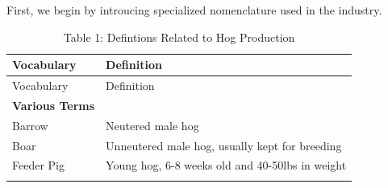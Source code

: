 \documentclass[]{book}
\theoremstyle{definition}
\theoremstyle{definition}
\theoremstyle{remark}
\begin{document}
First, we begin by introucing specialized nomenclature used in the
industry.

\begin{longtable}[]{@{}ll@{}}
\caption{Table 1: Defintions Related to Hog Production}\tabularnewline
\toprule
\begin{minipage}[b]{0.31\columnwidth}\raggedright\strut
Vocabulary\strut
\end{minipage} & \begin{minipage}[b]{0.24\columnwidth}\raggedright\strut
Definition\strut
\end{minipage}\tabularnewline
\midrule
\endfirsthead
\toprule
\begin{minipage}[b]{0.31\columnwidth}\raggedright\strut
Vocabulary\strut
\end{minipage} & \begin{minipage}[b]{0.24\columnwidth}\raggedright\strut
Definition\strut
\end{minipage}\tabularnewline
\midrule
\endhead
\begin{minipage}[t]{0.31\columnwidth}\raggedright\strut
\textbf{Various Terms}\strut
\end{minipage} & \begin{minipage}[t]{0.24\columnwidth}\raggedright\strut
\strut
\end{minipage}\tabularnewline
\begin{minipage}[t]{0.31\columnwidth}\raggedright\strut
Barrow\strut
\end{minipage} & \begin{minipage}[t]{0.24\columnwidth}\raggedright\strut
Neutered male hog\strut
\end{minipage}\tabularnewline
\begin{minipage}[t]{0.31\columnwidth}\raggedright\strut
Boar\strut
\end{minipage} & \begin{minipage}[t]{0.24\columnwidth}\raggedright\strut
Unneutered male hog, usually kept for breeding\strut
\end{minipage}\tabularnewline
\begin{minipage}[t]{0.31\columnwidth}\raggedright\strut
Feeder Pig\strut
\end{minipage} & \begin{minipage}[t]{0.24\columnwidth}\raggedright\strut
Young hog, 6-8 weeks old and 40-50lbs in weight\strut
\end{minipage}\tabularnewline
\begin{minipage}[t]{0.31\columnwidth}\raggedright\strut

\end{minipage}
\end{longtable}
\end{document}
